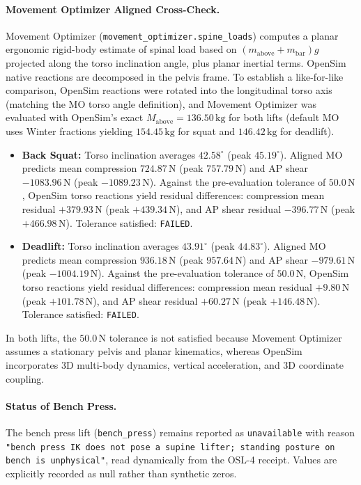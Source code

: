 \documentclass[11pt,a4paper]{article}
\begin{document}
\paragraph{Movement Optimizer Aligned Cross-Check.}
Movement Optimizer (\texttt{movement\_optimizer.spine\_loads}) computes a planar ergonomic rigid-body estimate
of spinal load based on $(m_{\text{above}} + m_{\text{bar}}) g$ projected along the torso inclination angle,
plus planar inertial terms. OpenSim native reactions are decomposed in the pelvis frame.
To establish a like-for-like comparison, OpenSim reactions were rotated into the longitudinal torso axis
(matching the MO torso angle definition), and Movement Optimizer was evaluated with OpenSim's exact $M_{\text{above}} = 136.50\,\mathrm{kg}$
for both lifts (default MO uses Winter fractions yielding $154.45\,\mathrm{kg}$ for squat and $146.42\,\mathrm{kg}$ for deadlift).
\begin{itemize}[noitemsep]
\item \textbf{Back Squat:} Torso inclination averages $42.58^\circ$ (peak $45.19^\circ$). Aligned MO predicts mean compression $724.87\,\mathrm{N}$ (peak $757.79\,\mathrm{N}$) and AP shear $-1083.96\,\mathrm{N}$ (peak $-1089.23\,\mathrm{N}$). Against the pre-evaluation tolerance of $50.0\,\mathrm{N}$, OpenSim torso reactions yield residual differences: compression mean residual $+379.93\,\mathrm{N}$ (peak $+439.34\,\mathrm{N}$), and AP shear residual $-396.77\,\mathrm{N}$ (peak $+466.98\,\mathrm{N}$). Tolerance satisfied: \texttt{FAILED}.
\item \textbf{Deadlift:} Torso inclination averages $43.91^\circ$ (peak $44.83^\circ$). Aligned MO predicts mean compression $936.18\,\mathrm{N}$ (peak $957.64\,\mathrm{N}$) and AP shear $-979.61\,\mathrm{N}$ (peak $-1004.19\,\mathrm{N}$). Against the pre-evaluation tolerance of $50.0\,\mathrm{N}$, OpenSim torso reactions yield residual differences: compression mean residual $+9.80\,\mathrm{N}$ (peak $+101.78\,\mathrm{N}$), and AP shear residual $+60.27\,\mathrm{N}$ (peak $+146.48\,\mathrm{N}$). Tolerance satisfied: \texttt{FAILED}.
\end{itemize}
In both lifts, the $50.0\,\mathrm{N}$ tolerance is not satisfied because Movement Optimizer assumes a stationary pelvis and planar kinematics, whereas OpenSim incorporates 3D multi-body dynamics, vertical acceleration, and 3D coordinate coupling.

\paragraph{Status of Bench Press.}
The bench press lift (\texttt{bench\_press}) remains reported as \texttt{unavailable} with reason
\texttt{"bench press IK does not pose a supine lifter; standing posture on bench is unphysical"},
read dynamically from the OSL-4 receipt. Values are explicitly recorded as null rather than synthetic zeros.
\end{document}
